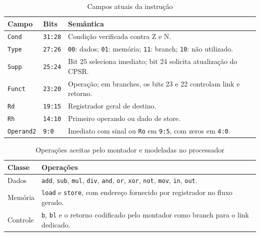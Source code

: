 \documentclass[
  12pt,
  oneside,
  a4paper,
  english,
  french,
  spanish,
  brazilian,
]{abntex2}
\begin{document}
\begin{table}[H]
\centering
\ABNTEXfontereduzida
\caption{Campos atuais da instrução}
\label{tab:campos}
\begin{tabular}{|p{}|p{}|p{}|}
\hline
\textbf{Campo} & \textbf{Bits} & \textbf{Semântica} \\
\hline
\texttt{Cond} & \texttt{31:28} & Condição verificada contra Z e N. \\
\hline
\texttt{Type} & \texttt{27:26} & \texttt{00}: dados; \texttt{01}: memória; \texttt{11}: branch; \texttt{10}: não utilizado. \\
\hline
\texttt{Supp} & \texttt{25:24} & Bit 25 seleciona imediato; bit 24 solicita atualização do CPSR. \\
\hline
\texttt{Funct} & \texttt{23:20} & Operação; em branches, os bits 23 e 22 controlam link e retorno. \\
\hline
\texttt{Rd} & \texttt{19:15} & Registrador geral de destino. \\
\hline
\texttt{Rh} & \texttt{14:10} & Primeiro operando ou dado de store. \\
\hline
\texttt{Operand2} & \texttt{9:0} & Imediato com sinal ou \texttt{Ro} em \texttt{9:5}, com zeros em \texttt{4:0}. \\
\hline
\end{tabular}
\end{table}

\begin{table}[H]
\centering
\ABNTEXfontereduzida
\caption{Operações aceitas pelo montador e modeladas no processador}
\label{tab:operacoes}
\begin{tabular}{|p{}|p{}|}
\hline
\textbf{Classe} & \textbf{Operações} \\
\hline
Dados & \texttt{add}, \texttt{sub}, \texttt{mul}, \texttt{div}, \texttt{and}, \texttt{or}, \texttt{xor}, \texttt{not}, \texttt{mov}, \texttt{in}, \texttt{out}. \\
\hline
Memória & \texttt{load} e \texttt{store}, com endereço fornecido por registrador no fluxo gerado. \\
\hline
Controle & \texttt{b}, \texttt{bl} e o retorno codificado pelo montador como branch para o link dedicado. \\
\hline
\end{tabular}
\end{table}
\end{document}
